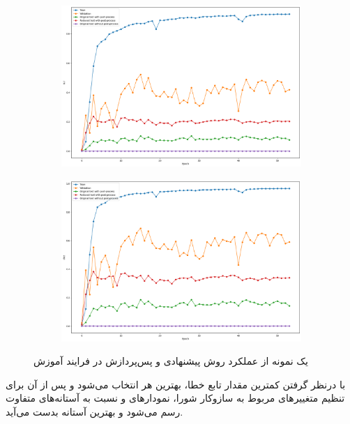  \begin{figure}[h!]
 		\centering %
 		\begin{subfigure}{0.49\textwidth}
 			\includegraphics[width=\linewidth]{Images/Chapter3/seg-IoU-metrics.png}
 			\caption{}
 			\label{fig:ch3-seg-IoU}
 		\end{subfigure}\hfil %
 		\begin{subfigure}{0.49\textwidth}
 			\includegraphics[width=\linewidth]{Images/Chapter3/seg-Dice-metrics.png.png}
 			\caption{}
 			\label{fig:ch3-seg-Dice}
 		\end{subfigure}\hfil %
 		\caption{یک نمونه از عملکرد روش پیشنهادی و پس‌پردازش در فرایند آموزش }
 		\label{fig:ch3-seg-training-graph}
 \end{figure}
 
 با درنظر گرفتن کمترین مقدار تابع خطا، بهترین
 هر 
 انتخاب می‌شود و پس از آن برای تنظیم متغییرهای مربوط به سازوکار شورا، نمودارهای 
 و 
 نسبت به آستانه‌های متفاوت رسم می‌شود و بهترین آستانه بدست می‌آید.
 
